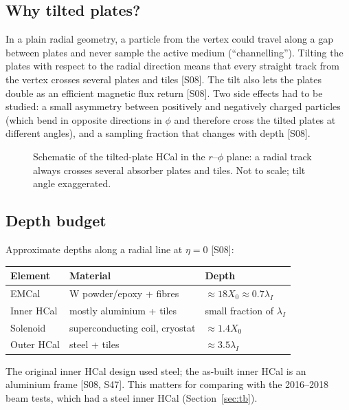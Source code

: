 \documentclass[11pt,letterpaper]{article}
\begin{document}
\subsection{Why tilted plates?}
In a plain radial geometry, a particle from the vertex could travel along a gap between plates and never sample the active medium (``channelling'').
Tilting the plates with respect to the radial direction means that every straight track from the vertex crosses several plates and tiles [S08].
The tilt also lets the plates double as an efficient magnetic flux return [S08].
Two side effects had to be studied: a small asymmetry between positively and negatively charged particles (which bend in opposite directions in $\phi$ and therefore cross the tilted plates at different angles), and a sampling fraction that changes with depth [S08].

\begin{figure}[h]\centering
{}
\caption{Schematic of the tilted-plate HCal in the $r$--$\phi$ plane: a radial track always crosses several absorber plates and tiles. Not to scale; tilt angle exaggerated.}\label{fig:tilt}
\end{figure}

\subsection{Depth budget}
Approximate depths along a radial line at $\eta=0$ [S08]:
\begin{center}\begin{tabular}{@{}lll@{}}\toprule
Element & Material & Depth\\\midrule
EMCal & W powder/epoxy + fibres & $\approx18X_0\approx0.7\lambda_I$\\
Inner HCal & mostly aluminium + tiles & small fraction of $\lambda_I$\\
Solenoid & superconducting coil, cryostat & $\approx1.4X_0$\\
Outer HCal & steel + tiles & $\approx3.5\lambda_I$\\\bottomrule
\end{tabular}\end{center}
The original inner HCal design used steel; the as-built inner HCal is an aluminium frame [S08, S47].
This matters for comparing with the 2016--2018 beam tests, which had a steel inner HCal (Section~\ref{sec:tb}).
\end{document}

